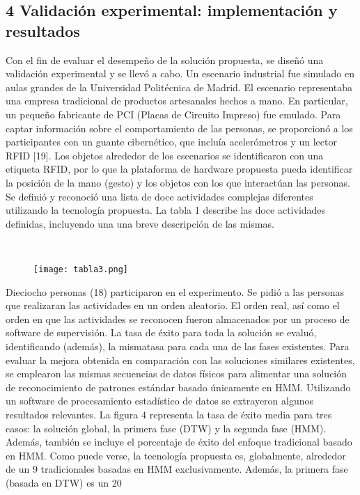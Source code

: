 \documentclass{paper}
\begin{document}
\subsection*{4 Validación experimental: implementación y resultados}

Con el fin de evaluar el desempeño de la solución propuesta, se diseñó una validación experimental y se llevó a cabo. Un escenario industrial fue simulado en aulas grandes de la Universidad Politécnica de Madrid. El escenario representaba una empresa tradicional de productos artesanales hechos a mano. En particular, un pequeño fabricante de PCI (Placas de Circuito Impreso) fue emulado.
Para captar información sobre el comportamiento de las personas, se proporcionó a los participantes con un guante cibernético, que incluía acelerómetros y un lector RFID [19]. Los objetos alrededor de los escenarios se identificaron con una etiqueta RFID, por lo que la plataforma de hardware propuesta pueda identificar la posición de la mano (gesto) y los objetos con los que interactúan las personas.
Se definió y reconoció una lista de doce actividades complejas diferentes utilizando la tecnología propuesta. La tabla 1 describe las doce actividades definidas, incluyendo una una breve descripción de las mismas. 

\ \begin{figure}[H]
    \centering
    \texttt{[image: tabla3.png]}
    \label{fig:my_label}
\end{figure}


Dieciocho personas (18) participaron en el experimento. Se pidió a las personas que realizaran las actividades en un orden aleatorio. El orden real, así como el orden en que las actividades se reconocen fueron almacenados por un proceso de software de supervisión. La tasa de éxito para toda la solución se evaluó, identificando (además), la mismatasa para cada una de las fases existentes.
Para evaluar la mejora obtenida en comparación con las soluciones similares existentes, se emplearon las mismas secuencias de datos físicos para alimentar una solución de reconocimiento de patrones estándar basado únicamente en HMM. Utilizando un software de procesamiento estadístico de datos se extrayeron algunos resultados relevantes.
La figura 4 representa la tasa de éxito media para tres casos: la solución global, la primera fase (DTW) y la segunda fase (HMM). Además, también se incluye el porcentaje de éxito del enfoque tradicional basado en HMM. Como puede verse, la tecnología propuesta es, globalmente, alrededor de un 9%
tradicionales basadas en HMM exclusivamente. Además, la primera fase (basada en DTW) es un 20%
\end{document}
